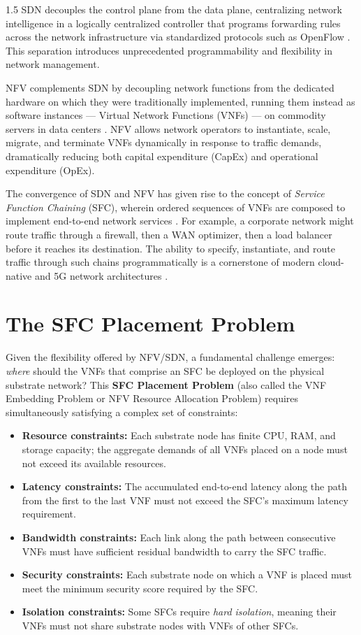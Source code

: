 \documentclass[A4paper,12pt]{report}
\theoremstyle{plain}
\theoremstyle{definition}
\theoremstyle{remark}
\numberwithin{equation}{section}
\begin{document}
\begin{spacing}{1.5}
SDN decouples the control plane from the data plane, centralizing network intelligence in a logically centralized controller that programs forwarding rules across the network infrastructure via standardized protocols such as OpenFlow \cite{mckeown2008}. This separation introduces unprecedented programmability and flexibility in network management.

NFV complements SDN by decoupling network functions from the dedicated hardware on which they were traditionally implemented, running them instead as software instances — Virtual Network Functions (VNFs) — on commodity servers in data centers \cite{etsi2013}. NFV allows network operators to instantiate, scale, migrate, and terminate VNFs dynamically in response to traffic demands, dramatically reducing both capital expenditure (CapEx) and operational expenditure (OpEx).

The convergence of SDN and NFV has given rise to the concept of \textit{Service Function Chaining} (SFC), wherein ordered sequences of VNFs are composed to implement end-to-end network services \cite{halpern2015}. For example, a corporate network might route traffic through a firewall, then a WAN optimizer, then a load balancer before it reaches its destination. The ability to specify, instantiate, and route traffic through such chains programmatically is a cornerstone of modern cloud-native and 5G network architectures \cite{nfv5g2017}.

\section{The SFC Placement Problem}

Given the flexibility offered by NFV/SDN, a fundamental challenge emerges: \textit{where} should the VNFs that comprise an SFC be deployed on the physical substrate network? This \textbf{SFC Placement Problem} (also called the VNF Embedding Problem or NFV Resource Allocation Problem) requires simultaneously satisfying a complex set of constraints:

\begin{itemize}
  \item \textbf{Resource constraints:} Each substrate node has finite CPU, RAM, and storage capacity; the aggregate demands of all VNFs placed on a node must not exceed its available resources.
  \item \textbf{Latency constraints:} The accumulated end-to-end latency along the path from the first to the last VNF must not exceed the SFC's maximum latency requirement.
  \item \textbf{Bandwidth constraints:} Each link along the path between consecutive VNFs must have sufficient residual bandwidth to carry the SFC traffic.
  \item \textbf{Security constraints:} Each substrate node on which a VNF is placed must meet the minimum security score required by the SFC.
  \item \textbf{Isolation constraints:} Some SFCs require \textit{hard isolation}, meaning their VNFs must not share substrate nodes with VNFs of other SFCs.
\end{itemize}


\end{spacing}
\end{document}

